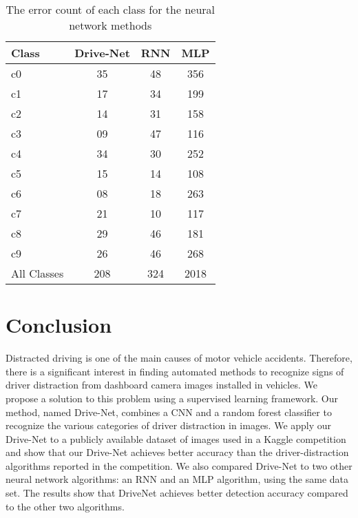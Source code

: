 \begin{table}[]
\centering
\caption{The error count of each class for the neural network methods}%
\label{tab:drive-net.table.2}
\begin{tabular}{@{}lccc@{}}
\toprule
\rowcolor[HTML]{FFFFFF}
Class       & Drive-Net & RNN & MLP  \\ \midrule
c0          & 35        & 48  & 356  \\
c1          & 17        & 34  & 199  \\
c2          & 14        & 31  & 158  \\
c3          & 09        & 47  & 116  \\
c4          & 34        & 30  & 252  \\
c5          & 15        & 14  & 108  \\
c6          & 08        & 18  & 263  \\
c7          & 21        & 10  & 117  \\
c8          & 29        & 46  & 181  \\
c9          & 26        & 46  & 268  \\
\rowcolor[HTML]{EFEFEF}
All Classes & 208       & 324 & 2018 \\ \bottomrule
\end{tabular}
\end{table}

\section{Conclusion}
Distracted driving is one of the main causes of motor vehicle accidents. Therefore, there is a significant interest in finding automated methods to recognize signs of driver distraction from dashboard camera images installed in vehicles. We propose a solution to this problem using a supervised learning framework. Our method, named Drive-Net, combines a CNN and a random forest classifier to recognize the various categories of driver distraction in images. We apply our Drive-Net to a publicly available dataset of images used in a Kaggle competition and show that our Drive-Net achieves better accuracy than the driver-distraction algorithms reported in the competition. We also compared Drive-Net to two other neural network algorithms: an RNN and an MLP algorithm, using the same data set. The results show that DriveNet achieves better detection accuracy compared to the other two algorithms.

